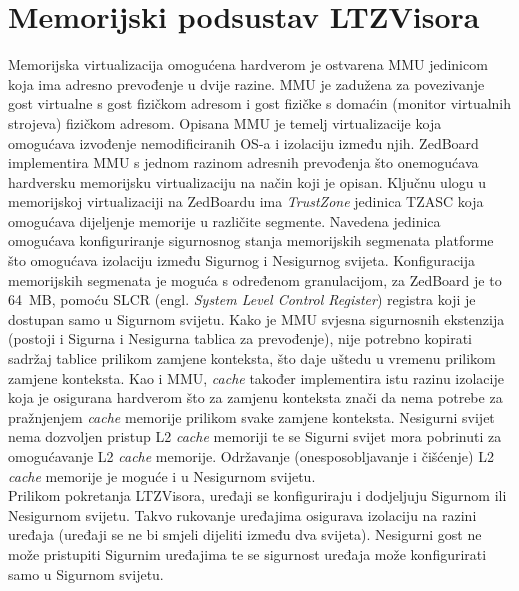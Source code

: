\documentclass[times, utf8, diplomski, numeric]{fer}
\begin{document}
\section{Memorijski podsustav LTZVisora}
Memorijska virtualizacija omogućena hardverom je ostvarena MMU jedinicom koja ima adresno prevođenje u dvije razine. MMU je
zadužena za povezivanje gost virtualne s gost fizičkom adresom i gost fizičke s domaćin (monitor virtualnih strojeva) fizičkom
adresom. Opisana MMU je temelj virtualizacije koja omogućava izvođenje nemodificiranih OS-a i izolaciju između njih. ZedBoard
implementira MMU s jednom razinom adresnih prevođenja što onemogućava hardversku memorijsku virtualizaciju na način koji je
opisan. Ključnu ulogu u memorijskoj virtualizaciji na ZedBoardu ima \textit{TrustZone} jedinica TZASC koja omogućava dijeljenje
memorije u različite segmente. Navedena jedinica omogućava konfiguriranje sigurnosnog stanja memorijskih segmenata platforme
što omogućava izolaciju između Sigurnog i Nesigurnog svijeta. Konfiguracija memorijskih segmenata je moguća s određenom
granulacijom, za ZedBoard je to 64~MB, pomoću SLCR (engl. \textit{System Level Control Register}) registra koji je dostupan
samo u Sigurnom svijetu. Kako je MMU svjesna sigurnosnih ekstenzija (postoji i Sigurna i Nesigurna tablica za prevođenje),
nije potrebno kopirati sadržaj tablice prilikom zamjene konteksta, što daje uštedu u vremenu prilikom zamjene konteksta.
Kao i MMU, \textit{cache} također implementira istu razinu izolacije koja je osigurana hardverom što za zamjenu konteksta
znači da nema potrebe za pražnjenjem \textit{cache} memorije prilikom svake zamjene konteksta. Nesigurni svijet nema dozvoljen
pristup L2 \textit{cache} memoriji te se Sigurni svijet mora pobrinuti za omogućavanje L2 \textit{cache} memorije. Održavanje
(onesposobljavanje i čišćenje) L2 \textit{cache} memorije je moguće i u Nesigurnom svijetu. \\
Prilikom pokretanja LTZVisora, uređaji se konfiguriraju i dodjeljuju Sigurnom ili Nesigurnom svijetu. Takvo rukovanje uređajima
osigurava izolaciju na razini uređaja (uređaji se ne bi smjeli dijeliti između dva svijeta). Nesigurni gost ne može pristupiti
Sigurnim uređajima te se sigurnost uređaja može konfigurirati samo u Sigurnom svijetu.
\end{document}
